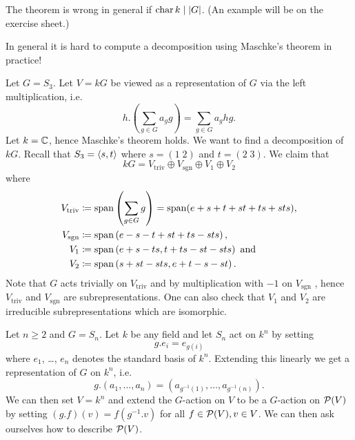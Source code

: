 \begin{warn}
  The theorem is wrong in general if $\operatorname{char} k \mid |G|$.
  (An example will be on the exercise sheet.)
\end{warn}

\begin{expl}
  In general it is hard to compute a decomposition using Maschke’s theorem in practice!
  
  Let $G = S_3$.
  Let $V = kG$ be viewed as a representation of $G$ via the left multiplication, i.e.\
  \[
      h.\left( \sum_{g \in G} a_g g \right)
    = \sum_{g \in G} a_g hg.
  \]
  Let $k = \mathbb{C}$, hence Maschke’s theorem holds. We want to find a decomposition of $kG$. Recall that $S_3 = \left\langle s,t \right\rangle$ where $s = (1 \; 2)$ and $t = (2 \; 3)$. We claim that
  \[
      kG
    = V_{\text{triv}} \oplus V_{\text{sgn}} \oplus V_1 \oplus V_2
  \]
  where
  \begin{align*}
                V_{\text{triv}}
    &\coloneqq  \operatorname{span}\left(\sum_{g \in G} g \right) = \operatorname{span}(e+s+t+st+ts+sts),
    \\
                V_{\text{sgn}}
    &\coloneqq  \operatorname{span}\left(e-s-t+st+ts-sts\right),
    \\
                V_1
    &\coloneqq  \operatorname{span}\left(e+s-ts, t+ts-st-sts\right)
    \text{ and}
    \\
                V_2
    &\coloneqq  \operatorname{span}\left(s+st-sts,e+t-s-st\right).
  \end{align*}
  Note that $G$ acts trivially on $V_{\text{triv}}$ and by multiplication with $-1$ on $V_{\text{sgn}}$ , hence $V_{\text{triv}}$ and $V_{\text{sgn}}$ are subrepresentations.
  One can also check that $V_1$ and $V_2$ are irreducible subrepresentations which are isomorphic.
\end{expl}


\begin{expl}
  Let $n \geq 2$ and $G = S_n$.
  Let $k$ be any field and let $S_n$ act on $k^n$ by setting
  \[
      g.e_i
    = e_{g(i)}
  \]
  where $e_1$, \dots, $e_n$ denotes the standard basis of $k^n$.
  Extending this linearly we get a representation of $G$ on $k^n$, i.e.\
  \[
    g.(a_1, \dotsc, a_n)
    = \left( a_{g^{-1}(1)}, \dotsc, a_{g^{-1}(n)} \right).
  \]
  We can then set $V = k^n$ and extend the $G$-action on $V$ to be a $G$-action on $\mathcal{P}(V)$ by setting $(g.f)(v) = f(g^{-1}.v)$ for all $f \in \mathcal{P}(V), v \in V$.
  We can then ask ourselves how to describe $\mathcal{P}(V)$.
\end{expl}


